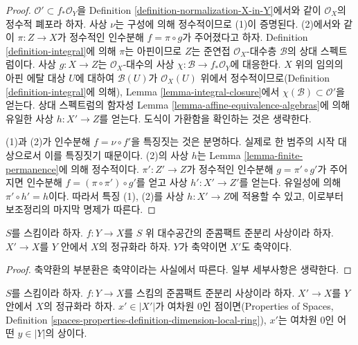\begin{proof}
$\mathcal{O}' \subset f_*\mathcal{O}_Y$을 Definition
\ref{definition-normalization-X-in-Y}에서와 같이 $\mathcal{O}_X$의
정수적 폐포라 하자. 사상 $\nu$는 구성에 의해 정수적이므로 (1)이
증명된다. (2)에서와 같이 $\pi : Z \to X$가 정수적인 인수분해
$f = \pi \circ g$가 주어졌다고 하자. Definition
\ref{definition-integral}에 의해 $\pi$는 아핀이므로 $Z$는 준연접
$\mathcal{O}_X$-대수층 $\mathcal{B}$의 상대 스펙트럼이다.
사상 $g : X \to Z$는 $\mathcal{O}_X$-대수의 사상
$\chi : \mathcal{B} \to f_*\mathcal{O}_Y$에 대응한다. $X$ 위의 임의의
아핀 에탈 대상 $U$에 대하여 $\mathcal{B}(U)$가
$\mathcal{O}_X(U)$ 위에서 정수적이므로(Definition
\ref{definition-integral}에 의해), Lemma
\ref{lemma-integral-closure}에서 $\chi(\mathcal{B}) \subset \mathcal{O}'$을
얻는다. 상대 스펙트럼의 함자성 Lemma
\ref{lemma-affine-equivalence-algebras}에 의해 유일한 사상
$h : X' \to Z$를 얻는다. 도식이 가환함을 확인하는 것은 생략한다.

\medskip\noindent
(1)과 (2)가 인수분해 $f = \nu \circ f'$을 특징짓는 것은 분명하다.
실제로 한 범주의 시작 대상으로서 이를 특징짓기 때문이다. (2)의 사상
$h$는 Lemma \ref{lemma-finite-permanence}에 의해 정수적이다.
$\pi' : Z' \to Z$가 정수적인 인수분해 $g = \pi' \circ g'$가 주어지면
인수분해 $f = (\pi \circ \pi') \circ g'$를 얻고 사상
$h' : X' \to Z'$를 얻는다. 유일성에 의해 $\pi' \circ h' = h$이다.
따라서 특징 (1), (2)를 사상 $h : X' \to Z$에 적용할 수 있고, 이로부터
보조정리의 마지막 명제가 따른다.
\end{proof}

\begin{lemma}
\label{lemma-normalization-in-reduced}
$S$를 스킴이라 하자. $f : Y \to X$를 $S$ 위 대수공간의 준콤팩트
준분리 사상이라 하자. $X' \to X$를 $Y$ 안에서 $X$의 정규화라 하자.
$Y$가 축약이면 $X'$도 축약이다.
\end{lemma}

\begin{proof}
축약환의 부분환은 축약이라는 사실에서 따른다. 일부 세부사항은
생략한다.
\end{proof}

\begin{lemma}
\label{lemma-normalization-generic}
$S$를 스킴이라 하자. $f : Y \to X$를 스킴의 준콤팩트 준분리 사상이라
하자. $X' \to X$를 $Y$ 안에서 $X$의 정규화라 하자.
$x' \in |X'|$가 여차원 $0$인 점이면(Properties of Spaces, Definition
\ref{spaces-properties-definition-dimension-local-ring}), $x'$는 여차원
$0$인 어떤 $y \in |Y|$의 상이다.
\end{lemma}

